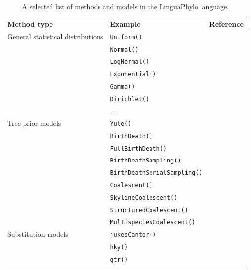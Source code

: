 \documentclass[10pt,letterpaper,table]{article}
\begin{document}
\begin{table}[h]
  \caption{A selected list of methods and models in the LinguaPhylo language.}
  \begin{tabular}{|l|l|l|}
    \hline
    Method type & Example & Reference \\\hline
    General statistical distributions & \texttt{Uniform()} &\\
              & \texttt{Normal()} &\\
              & \texttt{LogNormal()} &\\
              & \texttt{Exponential()} &\\
              & \texttt{Gamma()} &\\
              & \texttt{Dirichlet()} &\\ 
              & ... &\\\hline
    Tree prior models & \texttt{Yule()} & \cite{yule1925ii}\\
              & \texttt{BirthDeath()} &\\
              & \texttt{FullBirthDeath()} &\\
              & \texttt{BirthDeathSampling()} &\\
              & \texttt{BirthDeathSerialSampling()} & \cite{stadler2013dating}\\
              & \texttt{Coalescent()} & \cite{kingman82}\\
              & \texttt{SkylineCoalescent()} & \cite{pybus00,drummond2005bayesiansequences}\\
              & \texttt{StructuredCoalescent()} &\\
              & \texttt{MultispeciesCoalescent()} &\\\hline
    Substitution models & \texttt{jukesCantor()} & \cite{jc69}\\
              & \texttt{hky()} & \cite{hky}\\
              & \texttt{gtr()} & \cite{gtr}\\ \hline
  \end{tabular}
  \label{tab:generators}
\end{table}
\end{document}
